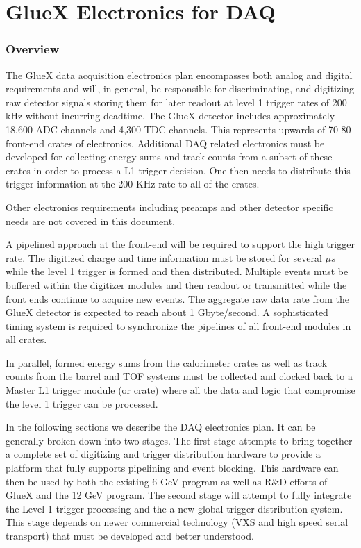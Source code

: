 \documentclass[10pt]{article}
\begin{document}
\section*{GlueX Electronics for DAQ}


\subsubsection*{Overview}

The GlueX data acquisition electronics plan encompasses both analog and digital requirements 
and will, in general, be responsible for discriminating, and digitizing raw detector signals
storing them for later readout at level 1 trigger rates of 200 kHz without incurring deadtime. 
The GlueX detector includes approximately 18,600 ADC channels and 4,300 TDC channels. This
represents upwards of 70-80 front-end crates of electronics. Additional DAQ related electronics 
must be developed for collecting energy sums and track counts from a subset of these crates in 
order to process a L1 trigger decision. One then needs to distribute this trigger information at
the 200 KHz rate to all of the crates. 

Other electronics requirements including preamps and other detector specific needs are not covered
in this document.

A pipelined approach at the front-end will be required to support the high trigger rate.  The
digitized charge and time information must be stored for several $ \mu s $ while the
level 1 trigger is formed and then distributed.  Multiple events must be buffered within
the digitizer modules and then readout or transmitted while the front ends continue to
acquire new events.  The aggregate raw data rate from the GlueX detector is expected to
reach  about 1 Gbyte/second. A sophisticated timing system is required to synchronize the
pipelines of all front-end modules in all crates. 

In parallel, formed energy sums from the calorimeter crates as well as track counts from the 
barrel and TOF systems must be collected and clocked back to a Master L1 trigger module (or crate) 
where all the data and logic that compromise the level 1 trigger can be processed.

In the following sections we describe the DAQ electronics plan. It can be generally broken down 
into two stages. The first stage attempts to bring together a complete set of digitizing and trigger
distribution hardware to provide a platform that fully supports pipelining and event blocking. This
hardware can then be used by both the existing 6 GeV program as well as R\&D efforts of GlueX and
the 12 GeV program. The second stage will attempt to fully integrate the Level 1 trigger processing 
and the a new global trigger distribution system. This stage depends on newer commercial technology 
(VXS and  high speed serial transport) that must be developed and better understood.
\end{document}
